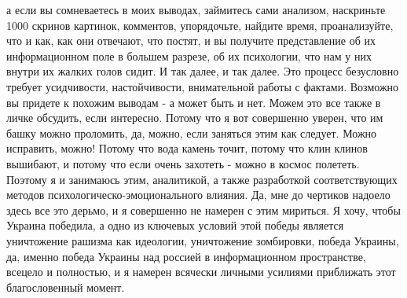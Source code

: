 а если вы сомневаетесь в моих выводах, займитесь сами анализом, наскриньте 1000
скринов картинок, комментов, упорядочьте, найдите время, проанализуйте, что и
как, как они отвечают, что постят, и вы получите представление об их
информационном поле в большем разрезе, об их психологии, что нам у них внутри
их жалких голов сидит. И так далее, и так далее. Это процесс безусловно требует
усидчивости, настойчивости, внимательной работы с фактами. Возможно вы придете
к похожим выводам - а может быть и нет. Можем это все также в личке обсудить,
если интересно. Потому что я вот совершенно уверен, что им башку можно
проломить, да, можно, если заняться этим как следует. Можно исправить, можно!
Потому что вода камень точит, потому что клин клинов вышибают, и потому что
если очень захотеть - можно в космос полететь. Поэтому я и занимаюсь этим,
аналитикой, а также разработкой соответствующих методов
психологическо-эмоционального влияния. Да, мне до чертиков надоело здесь все
это дерьмо, и я совершенно не намерен с этим мириться. Я хочу, чтобы Украина
победила, а одно из ключевых условий этой победы является уничтожение рашизма
как идеологии, уничтожение зомбировки, победа Украины, да, именно победа
Украины над россией в информационном пространстве, всецело и полностью, и я
намерен всячески личными усилиями приближать этот благословенный момент.
